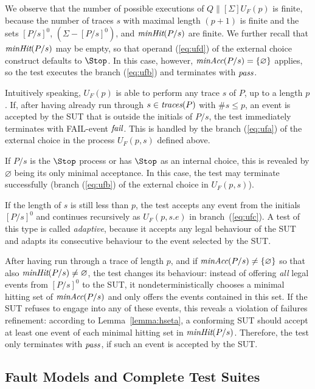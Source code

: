 We observe that the number of possible executions of $Q\parallel[\Sigma]
U_F(p)$ is finite, because the number of traces $s$ with maximal length
$(p+1)$ is finite and the sets $[P/s]^0$, $(\Sigma - [P/s]^0)$, and
$\text{\it minHit}(P/s)$ are finite. We further recall that $\text{\it minHit}(P/s)$ may be
empty, so that operand (\ref{eq:ufd}) of the external choice construct
defaults to $\Stop$. In this case, however, $\text{\it minAcc}(P/s) = \{\varnothing\}$
applies, so the test executes the branch (\ref{eq:ufb}) and terminates with
${\text{\it pass}}$. 

Intuitively speaking, $U_F(p)$ is able to perform any trace $s$ of $P$, up to
a length $p$. If, after having already run through $s\in\text{\it traces}(P)$ with
$\#s \le p$, an event is accepted by the SUT that is outside the initials of $P/s$,
the test immediately terminates with FAIL-event ${\text{\it fail}}$. This is handled by
the branch (\ref{eq:ufa}) of the external choice in the process $U_F(p,s)$
defined above.

If $P/s$ is the $\Stop$ process or has $\Stop$ as an internal choice,
this is revealed by $\varnothing$ being  its only minimal acceptance.
In this case, the test may terminate successfully (branch (\ref{eq:ufb}) of
the external choice in $U_F(p,s)$).


If the length of $s$ is still less than $p$, the test accepts any event from
the initials $[P/s]^0$ and continues recursively as $U_F(p,s.e)$ in
branch~(\ref{eq:ufc}). A test of this type is called \emph{adaptive}, because
it accepts any legal behaviour of the SUT and adapts its consecutive
behaviour to the event selected by the SUT.

After having run through a trace of length $p$, and if
$\text{\it minAcc}(P/s)\neq\{\varnothing\}$ so that also
$\text{\it minHit}(P/s)\neq\varnothing$, the test changes its behaviour: instead of
offering {\it all} legal events from $[P/s]^0$ to the SUT, it
nondeterministically chooses a minimal hitting set of $\text{\it minAcc}(P/s)$ and
only offers the events contained in this set. If the SUT refuses to engage
into any of these events, this reveals a violation of failures refinement:
according to Lemma~\ref{lemma:hseta}, a conforming SUT should accept at least
one event of each minimal hitting set in $\text{\it minHit}(P/s)$. Therefore, the test
only terminates with  ${\text{\it pass}}$, if such an event is accepted by the SUT.

\subsection{Fault Models and Complete Test Suites}

